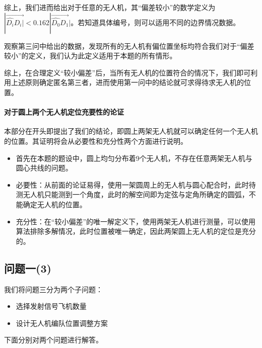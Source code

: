 \documentclass[withoutpreface,bwprint]{cumcmthesis} %
\begin{document}
			综上，我们进而给出对于任意的无人机，其“偏差较小”的数学定义为$|\overrightarrow{\widehat{D_i}D_i|}<0.162|\overrightarrow{\widehat{D_0}D_1}|$。若知道具体编号，则可以适用不同的边界情况数据。
			
			观察第三问中给出的数据，发现所有的无人机有偏位置坐标均符合我们对于“偏差较小”的定义，我们认为此定义适用于本题的所有情形。
			
			综上，在合理定义“较小偏差”后，当所有无人机的位置符合的情况下，我们即可利用上述原则确定匿名第三者，进而使用第一问中的结论就可求得待求无人机的位置。
			
			\paragraph{对于圆上两个无人机定位充要性的论证}
			本部分在开头即提出了我们的结论，即圆上两架无人机就可以确定任何一个无人机的位置。其证明将会从必要性和充分性两个方面进行说明。
			\begin{itemize}
				\item	首先在本题的题设中，圆上均匀分布着9个无人机，不存在任意两架无人机与圆心共线的问题。
				\item	必要性：从前面的论证易得，使用一架圆周上的无人机与圆心配合时，此时待测无人机只能测到一个角度，此时的解空间即为定弦与定角所确定的圆弧，不能确定无人机的位置。
				\item	充分性：在“较小偏差”的唯一解定义下，使用两架无人机进行测量，可以使用算法排除多解情况，此时位置被唯一确定，因此两架圆上无人机的定位是充分的。
			\end{itemize}
			
		\subsection{问题一(3)}
			\par 我们将问题三分为两个子问题：
			\begin{itemize}
				\item 选择发射信号飞机数量
				\item 设计无人机编队位置调整方案
			\end{itemize}
			下面分别对两个问题进行解答。
\end{document}
